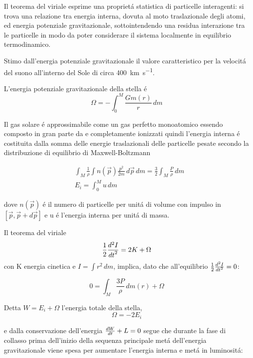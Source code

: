 \documentclass[../main.tex]{subfiles}
\begin{document}
Il teorema del viriale esprime una propriet\'a statistica di particelle interagenti: si trova una relazione tra energia interna, dovuta al moto traslazionale degli atomi, ed energia potenziale gravitazionale, sottointendendo una residua interazione tra le particelle in modo da poter considerare il sistema localmente in equilibrio termodinamico.

\begingroup
\color{grey}
Stimo dall'energia potenziale gravitazionale il valore caratteristico per la velocit\'a del suono all'interno del Sole di circa \SI{400}{\kilo\meter\per\second}.
\endgroup

L'energia potenziale gravitazionale della stella \'e
\begin{equation}
\Omega=-\int_0^M\frac{Gm(r)}{r}\,dm\label{eq:energiapg}
\end{equation}

Il gas solare \'e approssimabile come un gas perfetto monoatomico essendo composto in gran parte da  e  completamente ionizzati quindi l'energia interna \'e costituita dalla somma delle energie traslazionali delle particelle pesate secondo la distribuzione di equilibrio di Maxwell-Boltzmann

\begin{align}
&\int_M\frac{1}{\rho}\int n(\vec{p})\frac{p^2}{2m}\,d\vec{p}\,dm=\frac{3}{2}\int_M\frac{P}{\rho}\,dm\\
&E_i=\int_0^Mu\,dm
\end{align}

dove $n(\vec{p})$ \'e il numero di particelle per unit\'a di volume con impulso in $[\vec{p},\vec{p}+d\vec{p}]$ e u \'e l'energia interna per unit\'a di massa.

Il teorema del viriale 
\begin{equation}
\frac{1}{2}\TtwoDy{t}{I}=2K+\Omega
\end{equation}
con K energia cinetica e $I=\int r^2\,dm$, implica, dato che all'equilibrio $\frac{1}{2}\TtwoDy{t}{I}=0$:

\begin{equation}
0=\int_M\frac{3P}{\rho}\,dm(r)+\Omega
\end{equation}

\begingroup
\color{midnightblue}

Detta $W=E_i+\Omega$ l'energia totale della stella, 
\begin{equation}
\Omega=-2E_i\label{eq:virialegpm}
\end{equation}

e dalla conservazione dell'energia $\TDy{t}{W}+L=0$ segue che durante la fase di collasso prima dell'inizio della sequenza principale met\'a dell'energia gravitazionale viene spesa per aumentare l'energia interna e met\'a in luminosit\'a:
\end{document}
